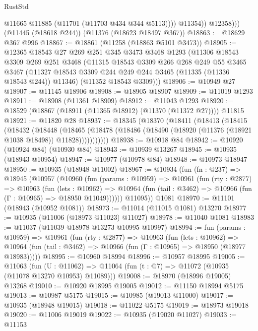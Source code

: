 \begin{lexlean}{RustStd}
\begin{coremodule}
{{{{{{{{{{{{{{{{{{{                  @11665
                  @11885
                  (@11701 (@11703 @434 @344 @5113))))
              @11354))
          @12358)))
    (@11445 (@18618 @244))
    (@11376 (@18623 @18497 @367))
@18863 := @18629 @367 @996
@18867 := @18861 (@11258 (@18863 @5101 @3473))
@18905 := @12365
    @18543
    @27
    @269
    @251
    @345
    @3473
    @3468
    @1293
    (@11306
      @18543
      @3309
      @269
      @251
      @3468
      (@11315
        @18543
        @3309
        @266
        @268
        @249
        @55
        @3465
        @3467
        (@11327 @18543 @3309 @244 @249 @244 @3465 (@11335 (@11336 @18543 @244)) @11346)
        (@11352 @18543 @3309)))
@18906 := @10949 @27
@18907 := @11145 @18906
@18908 := @18905 @18907
@18909 := @11019 @1293
@18911 := @18908 (@11361 @18909)
@18912 := @11043 @1293
@18920 := @18529 (@18867 (@18911 (@11365 @18912) (@11370 (@11372 @27)))) @11815
@18921 := @11820 @28
@18937 := @18345
    (@18370
      (@18411
        (@18413
          (@18415
            (@18432
              (@18448
                (@18465
                  (@18478 (@18486 (@18490 (@18920 (@11376 (@18921 @1038 @18498)) @11828)))))))))))
@18938 := @10918 @84
@18942 := @10920 (@10924 @84) (@10930 @84)
@18943 := @10939 @13267
@18945 := @10935 (@18943 @10954)
@18947 := @10977 (@10978 @84)
@18948 := @10973 @18947
@18950 := @10935 (@18948 @11002)
@18967 := @10934
    (fun (fn : @237) =>
    @18945
      (@10957
        (@10960
          (fun (params : @10959) =>
          @10961
            (fun (rty : @2877) =>
            @10963
              (fun (lets : @10962) =>
              @10964 (fun (tail : @3462) => @10966 (fun (Γ : @10965) => @18950 @11049))))))
        @11095))
    @1081
@18970 := @11101 (@18943 (@10952 @1081))
@18973 := @11014 (@11015 @1081) @13270
@18977 := @10935 (@11006 (@18973 @11023) @11027)
@18978 := @11040 @1081
@18983 := @11037 (@11039 @18978 @13273 @10995 @10997)
@18994 := fun (params : @10959) =>
  @10961
    (fun (rty : @2877) =>
    @10963
      (fun (lets : @10962) =>
      @10964 (fun (tail : @3462) => @10966 (fun (Γ : @10965) => @18950 (@18977 @18983)))))
@18995 := @10960 @18994
@18996 := @10957 @18995
@19005 := @11063
    (fun (U : @11062) => @11064 (fun (t : @7) => @11072 (@10935 (@11078 @13270 @10953) @11089)))
@19008 := @18970 (@18996 @19005) @13268
@19010 := @10920 @18995 @19005
@19012 := @11150 @18994 @5175
@19013 := @10987 @5175
@19015 := @10985 (@19013 @11000)
@19017 := @10935 (@18948 @19015)
@19018 := @11022 @5175
@19019 := @18973 @19018
@19020 := @11006 @19019
@19022 := @10935 (@19020 @11027)
@19033 := @11153
}}}}}}}}}}}}}}}}}}}
\end{coremodule}
\end{lexlean}
